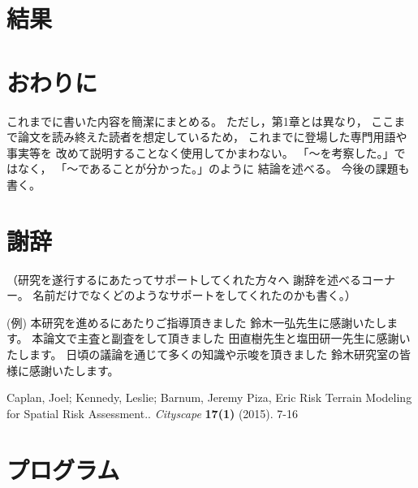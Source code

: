 \documentclass[12pt,a4paper,oneside]{jsbook}
\theoremstyle{plain}
\begin{document}
\chapter{結果}
\chapter{おわりに}
\label{chapter_5}
これまでに書いた内容を簡潔にまとめる。
ただし，第1章とは異なり，
ここまで論文を読み終えた読者を想定しているため，
これまでに登場した専門用語や事実等を
改めて説明することなく使用してかまわない。
「～を考察した。」ではなく，
「～であることが分かった。」のように
結論を述べる。
今後の課題も書く。


\chapter*{謝辞}
（研究を遂行するにあたってサポートしてくれた方々へ
謝辞を述べるコーナー。
名前だけでなくどのようなサポートをしてくれたのかも書く。）

(例)
本研究を進めるにあたりご指導頂きました
鈴木一弘先生に感謝いたします。
本論文で主査と副査をして頂きました
田直樹先生と塩田研一先生に感謝いたします。
日頃の議論を通じて多くの知識や示唆を頂きました
鈴木研究室の皆様に感謝いたします。



\renewcommand{\bibname}{参考文献}
\begin{thebibliography}{99}


Caplan, Joel;
Kennedy, Leslie;
Barnum, Jeremy
Piza, Eric
{Risk Terrain Modeling for Spatial Risk Assessment.}.
{\em Cityscape}
{\bfseries 17(1)}
(2015).
7-16



\end{thebibliography}


\appendix
\chapter{プログラム}
\label{program}


\end{document}
